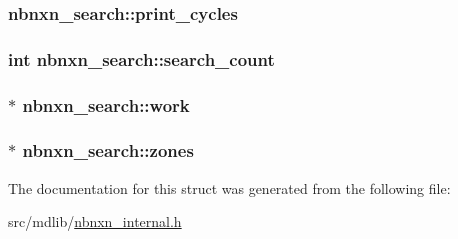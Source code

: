\hypertarget{structnbnxn__search_a7f63529b5a911e7164af45c21525a2ed}{
\subsubsection[{print\-\_\-cycles}]{ {\bf nbnxn\-\_\-search\-::print\-\_\-cycles}}}\label{structnbnxn__search_a7f63529b5a911e7164af45c21525a2ed}
\hypertarget{structnbnxn__search_a15858ff5a6cd89470a33e0f593968cf2}{
\subsubsection[{search\-\_\-count}]{\setlength{\rightskip}{0pt plus 5cm}int {\bf nbnxn\-\_\-search\-::search\-\_\-count}}}\label{structnbnxn__search_a15858ff5a6cd89470a33e0f593968cf2}
\hypertarget{structnbnxn__search_a6551d71012a9005f9cba6af84a4ed541}{
\subsubsection[{work}]{$\ast$ {\bf nbnxn\-\_\-search\-::work}}}\label{structnbnxn__search_a6551d71012a9005f9cba6af84a4ed541}
\hypertarget{structnbnxn__search_abad2e1043fa0ba4d0a4128bb5ac3d740}{
\subsubsection[{zones}]{$\ast$ {\bf nbnxn\-\_\-search\-::zones}}}\label{structnbnxn__search_abad2e1043fa0ba4d0a4128bb5ac3d740}


\-The documentation for this struct was generated from the following file\-:\begin{DoxyCompactItemize}
\item 
src/mdlib/\hyperlink{nbnxn__internal_8h}{nbnxn\-\_\-internal.\-h}\end{DoxyCompactItemize}
